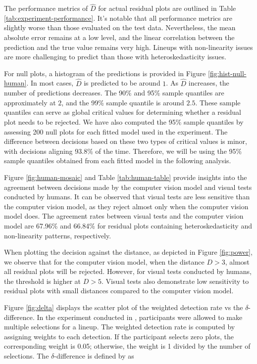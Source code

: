 \documentclass[]{interact}
\theoremstyle{plain}%
\theoremstyle{definition}
\theoremstyle{remark}
\begin{document}
The performance metrics of \(\hat{D}\) for actual residual plots are
outlined in Table \ref{tab:experiment-performance}. It's notable that
all performance metrics are slightly worse than those evaluated on the
test data. Nevertheless, the mean absolute error remains at a low level,
and the linear correlation between the prediction and the true value
remains very high. Lineups with non-linearity issues are more
challenging to predict than those with heteroskedasticity issues.

For null plots, a histogram of the predictions is provided in Figure
\ref{fig:hist-null-human}. In most cases, \(\hat{D}\) is predicted to be
around \(1\). As \(\hat{D}\) increases, the number of predictions
decreases. The 90\% and 95\% sample quantiles are approximately at
\(2\), and the 99\% sample quantile is around \(2.5\). These sample
quantiles can serve as global critical values for determining whether a
residual plot needs to be rejected. We have also computed the 95\%
sample quantiles by assessing 200 null plots for each fitted model used
in the experiment. The difference between decisions based on these two
types of critical values is minor, with decisions aligning 93.8\% of the
time. Therefore, we will be using the 95\% sample quantiles obtained
from each fitted model in the following analysis.

Figure \ref{fig:human-mosaic} and Table \ref{tab:human-table} provide
insights into the agreement between decisions made by the computer
vision model and visual tests conducted by humans. It can be observed
that visual tests are less sensitive than the computer vision model, as
they reject almost only when the computer vision model does. The
agreement rates between visual tests and the computer vision model are
67.96\% and 66.84\% for residual plots containing heteroskedasticity and
non-linearity patterns, respectively.

When plotting the decision against the distance, as depicted in Figure
\ref{fig:power}, we observe that for the computer vision model, when the
distance \(D > 3\), almost all residual plots will be rejected. However,
for visual tests conducted by humans, the threshold is higher at
\(D > 5\). Visual tests also demonstrate low sensitivity to residual
plots with small distances compared to the computer vision model.

Figure \ref{fig:delta} displays the scatter plot of the weighted
detection rate vs the \(\delta\)-difference. In the experiment conducted
in \citet{li2023plot}, participants were allowed to make multiple
selections for a lineup. The weighted detection rate is computed by
assigning weights to each detection. If the participant selects zero
plots, the corresponding weight is 0.05; otherwise, the weight is 1
divided by the number of selections. The \(\delta\)-difference is
defined by \citet{chowdhury2018measuring} as
\end{document}
